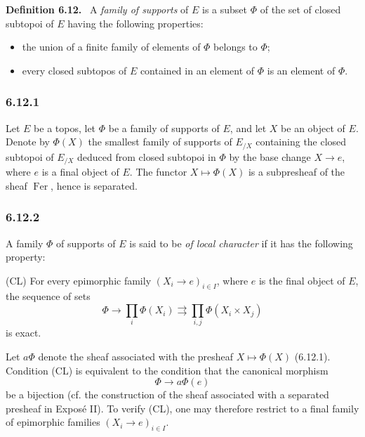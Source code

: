 \documentclass[11pt]{article}
\newcommand{\Fer}{\operatorname{Fer}}
\newenvironment{statement}[1]{\par\medskip\noindent\textbf{#1.}\ }{\par\medskip}
\begin{document}
\begin{statement}{Definition 6.12}
A \emph{family of supports} of $E$ is a subset $\Phi$ of the set of closed subtopoi of $E$ having the following properties:
\begin{itemize}
\item[(S1)] the union of a finite family of elements of $\Phi$ belongs to $\Phi$;
\item[(S2)] every closed subtopos of $E$ contained in an element of $\Phi$ is an element of $\Phi$.
\end{itemize}
\end{statement}

\subsubsection*{6.12.1}
Let $E$ be a topos, let $\Phi$ be a family of supports of $E$, and let $X$ be an object of $E$. Denote by $\Phi(X)$ the smallest family of supports of $E_{/X}$ containing the closed subtopoi of $E_{/X}$ deduced from closed subtopoi in $\Phi$ by the base change $X\to e$, where $e$ is a final object of $E$. The functor $X\mapsto \Phi(X)$ is a subpresheaf of the sheaf $\Fer$, hence is separated.

\subsubsection*{6.12.2}
A family $\Phi$ of supports of $E$ is said to be \emph{of local character} if it has the following property:

\medskip
\noindent(CL) For every epimorphic family $(X_i\to e)_{i\in I}$, where $e$ is the final object of $E$, the sequence of sets
\[
        \Phi\longrightarrow \prod_i\Phi(X_i)\rightrightarrows \prod_{i,j}\Phi(X_i\times X_j)
\]
is exact.

Let $a\Phi$ denote the sheaf associated with the presheaf $X\mapsto \Phi(X)$ (6.12.1). Condition (CL) is equivalent to the condition that the canonical morphism
\[
        \Phi\to a\Phi(e)
\]
be a bijection (cf. the construction of the sheaf associated with a separated presheaf in Expos\'e II). To verify (CL), one may therefore restrict to a final family of epimorphic families $(X_i\to e)_{i\in I}$.
\end{document}
